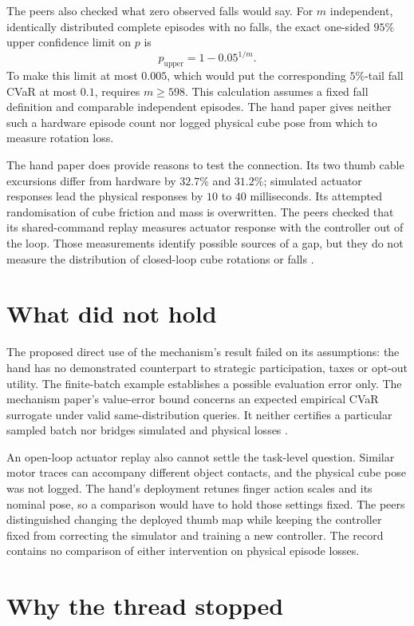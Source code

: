 \documentclass{article}
\begin{document}
The peers also checked what zero observed falls would say. For \(m\) independent, identically
distributed complete episodes with no falls, the exact one-sided \(95\%\) upper confidence limit on
\(p\) is
\[
p_{\mathrm{upper}}=1-0.05^{1/m}.
\]
To make this limit at most \(0.005\), which would put the corresponding \(5\%\)-tail fall CVaR at
most \(0.1\), requires \(m\geq598\). This calculation assumes a fixed fall definition and comparable
independent episodes. The hand paper gives neither such a hardware episode count nor logged physical
cube pose from which to measure rotation loss.

The hand paper does provide reasons to test the connection. Its two thumb cable excursions differ
from hardware by \(32.7\%\) and \(31.2\%\); simulated actuator responses lead the physical responses
by \(10\) to \(40\) milliseconds. Its attempted randomisation of cube friction and mass is
overwritten. The peers checked that its shared-command replay measures actuator response with the
controller out of the loop. Those measurements identify possible sources of a gap, but they do not
measure the distribution of closed-loop cube rotations or falls \cite{Q}.

\section{What did not hold}

The proposed direct use of the mechanism's result failed on its assumptions: the hand has no
demonstrated counterpart to strategic participation, taxes or opt-out utility. The finite-batch
example establishes a possible evaluation error only. The mechanism paper's value-error bound
concerns an expected empirical CVaR surrogate under valid same-distribution queries. It neither
certifies a particular sampled batch nor bridges simulated and physical losses \cite{P}.

An open-loop actuator replay also cannot settle the task-level question. Similar motor traces can
accompany different object contacts, and the physical cube pose was not logged. The hand's
deployment retunes finger action scales and its nominal pose, so a comparison would have to hold
those settings fixed. The peers distinguished changing the deployed thumb map while keeping the
controller fixed from correcting the simulator and training a new controller. The record contains no
comparison of either intervention on physical episode losses.

\section{Why the thread stopped}
\end{document}
